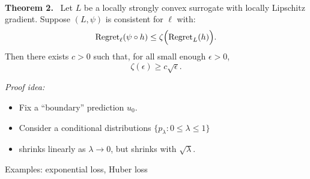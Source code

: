 \documentclass[t,mathserif,12pt,aspectratio=1610,handout]{beamer}
\begin{document}
\begin{frame}{~}{}
  {\vspace*{-3ex}}
  \begin{block}{\vspace*{-3ex}}
    \textbf{Theorem 2.}~
    Let $L$ be a locally strongly convex surrogate with locally Lipschitz gradient.
    Suppose $(L,\psi)$ is consistent for $\ell$ with:
    \[  \mathrm{Regret}_{\ell}(\psi \circ h) \leq \zeta\Big( \mathrm{Regret}_L(h) \Big) . \]
    Then there exists $c > 0$ such that, for all small enough $\epsilon > 0$,
    \[ \zeta(\epsilon) \geq c \sqrt{\epsilon} . \]
  \end{block}

  \pause
  \emph{Proof idea:}
  \begin{itemize}
  \item Fix a ``boundary'' prediction $u_0$.
  \item Consider a conditional distributions $\{p_{\lambda} : 0 \leq \lambda \leq 1\}$
  \item {} shrinks linearly as $\lambda \to 0$, but  shrinks with $\sqrt{\lambda}$.
  \end{itemize}

  \pause
  Examples: exponential loss, Huber loss 
\end{frame}


\end{document}
